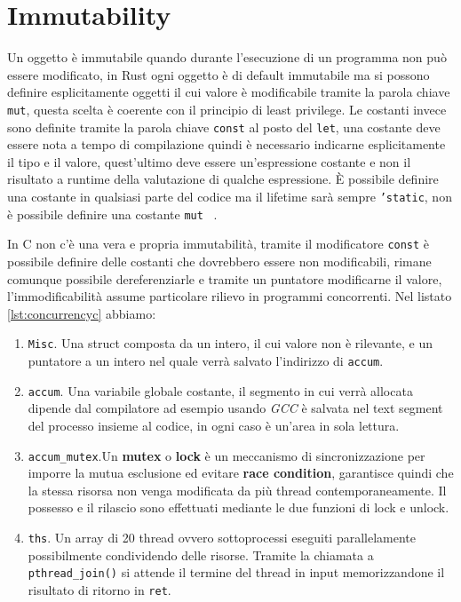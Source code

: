 \documentclass[Lau,binding=0.6cm]{sapthesis}
\newcommand{\textcode}[1]{\colorbox{backcolour}{\texttt{#1}}}
\begin{document}
\section{Immutability}
Un oggetto è immutabile quando durante l'esecuzione di un programma non può essere modificato, in Rust ogni oggetto è di default immutabile ma si possono definire esplicitamente oggetti il cui valore è modificabile tramite la parola chiave \textcode{mut}, questa scelta è coerente con il principio di least privilege.
Le costanti invece sono definite tramite la parola chiave \textcode{const} al posto del \textcode{let}, una costante deve essere nota a tempo di compilazione quindi è necessario indicarne esplicitamente il tipo e il valore, quest'ultimo deve essere un'espressione costante e non il risultato a runtime della valutazione di qualche espressione.
È possibile definire una costante in qualsiasi parte del codice ma il lifetime sarà sempre \textcode{'static}, non è possibile definire una costante \textcode{mut} ~\cite[3.1]{rust:language}.

In C non c'è una vera e propria immutabilità, tramite il modificatore \textcode{const} è possibile definire delle costanti che dovrebbero essere non modificabili, rimane comunque possibile dereferenziarle e tramite un puntatore modificarne il valore, l'immodificabilità assume particolare rilievo in programmi concorrenti. 
Nel listato \ref{lst:concurrencyc} abbiamo:
\begin{enumerate}
    \item \textcode{Misc}. Una struct composta da un intero, il cui valore non è rilevante, e un puntatore a un intero nel quale verrà salvato l'indirizzo di \textcode{accum}. 
    \item \textcode{accum}. Una variabile globale costante, il segmento in cui verrà allocata dipende dal compilatore ad esempio usando \textit{GCC} è salvata nel text segment del processo insieme al codice, in ogni caso è un'area in sola lettura.
    \item \textcode{accum\_mutex}.Un \textbf{mutex} o \textbf{lock} è un meccanismo di sincronizzazione per imporre la mutua esclusione ed evitare \textbf{race condition}, garantisce quindi che la stessa risorsa non venga modificata da più thread contemporaneamente.
    Il possesso e il rilascio sono effettuati mediante le due funzioni di lock e unlock.
    \item \texttt{ths}. Un array di 20 thread ovvero sottoprocessi eseguiti parallelamente possibilmente condividendo delle risorse.
    Tramite la chiamata a \textcode{pthread\_join()} si attende il termine del thread in input memorizzandone il risultato di ritorno in \textcode{ret}. 
\end{enumerate}
\end{document}
